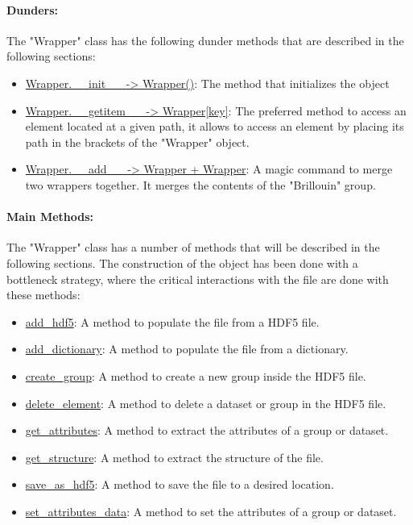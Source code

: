 \paragraph{Dunders:} 
The "Wrapper" class has the following dunder methods that are described in the following sections:
\begin{itemize}
    \item \hyperref[subchapter:wrapper.__init__]{Wrapper.\_\_init\_\_ -> Wrapper()}: The method that initializes the object
    \item \hyperref[subchapter:wrapper.__getitem__]{Wrapper.\_\_getitem\_\_ -> Wrapper[key]}: The preferred method to access an element located at a given path, it allows to access an element by placing its path in the brackets of the "Wrapper" object.
    \item \hyperref[subchapter:wrapper.__add__]{Wrapper.\_\_add\_\_ -> Wrapper + Wrapper}: A magic command to merge two wrappers together. It merges the contents of the "Brillouin" group.
\end{itemize}

\paragraph{Main Methods:} 
The "Wrapper" class has a number of methods that will be described in the following sections. The construction of the object has been done with a bottleneck strategy, where the critical interactions with the file are done with these methods:
\begin{itemize}
    \item \hyperref[subchapter:wrapper.add_hdf5]{add\_hdf5}: A method to populate the file from a HDF5 file.
    \item \hyperref[subchapter:wrapper.add_dictionary]{add\_dictionary}: A method to populate the file from a dictionary.
    \item \hyperref[subchapter:wrapper.create_group]{create\_group}: A method to create a new group inside the HDF5 file.
    \item \hyperref[subchapter:wrapper.delete_element]{delete\_element}: A method to delete a dataset or group in the HDF5 file.
    \item \hyperref[subchapter:wrapper.get_attributes]{get\_attributes}: A method to extract the attributes of a group or dataset.
    \item \hyperref[subchapter:wrapper.get_structure]{get\_structure}: A method to extract the structure of the file.
    \item \hyperref[subchapter:wrapper.save_as_hdf5]{save\_as\_hdf5}: A method to save the file to a desired location.
    \item \hyperref[subchapter:wrapper.set_attributes_data]{set\_attributes\_data}: A method to set the attributes of a group or dataset.
\end{itemize}

